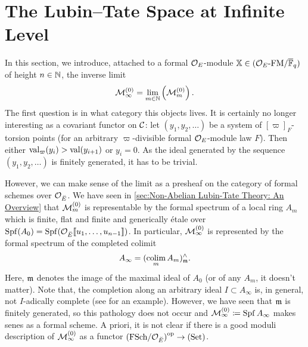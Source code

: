 \documentclass[../main.tex]{subfiles}
\begin{document}
\section{The Lubin--Tate Space at Infinite Level}
In this section, we introduce, attached to a formal $\mathcal{O}_E$-module
$\mathbb{X} \in {({\mathcal{O}_E}\text-\allowbreak\mathrm{FM}/{{\overline{\mathbb{F}}_q}})}$ of height $n \in \mathbb{N}$, the inverse limit
\begin{equation*}
  \mathcal{M}_{\infty}^{(0)} = \lim_{m \in \mathbb{N}} \left(\mathcal{M}_{m}^{(0)}\right).
\end{equation*}
The first question is in what category this objects lives. It is
certainly no longer interesting as a covariant functor on $\mathcal{C}$: let $(y_1, y_2, \dots)$ be a system of $[\varpi]_F$-torsion points
(for an arbitrary $\varpi$-divisible formal $\mathcal{O}_E$-module law $F$). Then either
$\mathrm{val}_\varpi(y_i) > \mathrm{val}(y_{i+1})$ or $y_i = 0$. As
the ideal generated by the sequence $(y_1, y_2, \dots)$ is finitely generated, it has to be trivial.

However, we can make sense of the limit as a presheaf on the category of formal schemes over $\mathcal{O}_{\breve {E}}$. We have seen in \cref{sec:Non-Abelian Lubin-Tate Theory: An Overview} that $\mathcal{M}_{m}^{(0)}$ is 
representable by the formal spectrum of a local ring $A_m$ which
is finite, flat and finite and generically \'etale
over $\operatorname{Spf}(A_0) = \operatorname{Spf}(\mathcal{O}_{{\breve {E}}}\llbracket u_1, \dots, u_{n-1}\rrbracket)$. In particular,
$\mathcal{M}_{\infty}^{(0)}$ is represented by 
the formal spectrum of the completed colimit 
\begin{equation*}
  A_\infty = (\operatorname*{colim}_m A_m)^\wedge_{\mathfrak{m}}.
\end{equation*}
Here, $\mathfrak{m}$ denotes the image of the maximal ideal of $A_0$ (or of any $A_m$, it doesn't
matter). Note that, the completion 
along an arbitrary ideal $I \subset A_\infty$ is, in general, not $I$-adically
complete (see \cite[\href{https://stacks.math.columbia.edu/tag/05JA}{Tag
05JA}]{stacks-project} for an example). However, we have seen that $\mathfrak{m}$ is
finitely generated, so this pathology does not occur and $\mathcal{M}_\infty^{(0)}
\coloneqq \operatorname{Spf} A_\infty$ makes senes as a formal scheme. A priori, it is not clear 
if there is a good moduli description of $\mathcal{M}_\infty^{(0)}$ as a functor
${(\mathrm{FSch}/{\mathcal{O}_{\breve {E}}})}^{{\mathrm{op}}} \to {(\mathrm{Set})}$.
\end{document}
